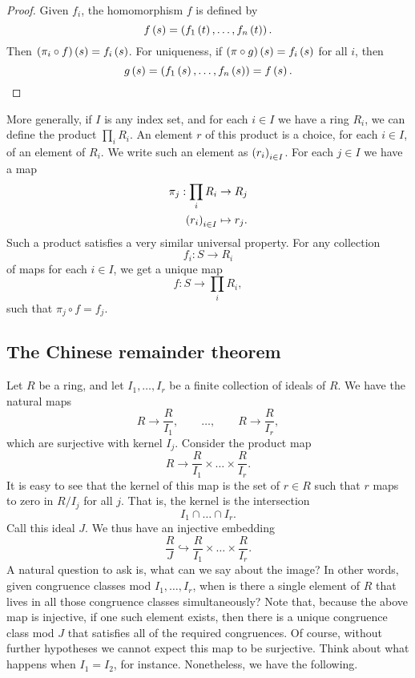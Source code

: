 \begin{proof}
Given $ f_i $, the homomorphism $ f $ is defined by
$$ f\left( s \right) = \left( f_1\left( t \right), \dots, f_n\left( t \right) \right). $$
Then $ \left( \pi_i \circ f \right)\left( s \right) = f_i\left( s \right) $. For uniqueness, if $ \left( \pi \circ g \right)\left( s \right) = f_i\left( s \right) $ for all $ i $, then
$$ g\left( s \right) = \left( f_1\left( s \right), \dots, f_n\left( s \right) \right) = f\left( s \right). $$
\end{proof}

More generally, if $ I $ is any index set, and for each $ i \in I $ we have a ring $ R_i $, we can define the product $ \prod_i R_i $. An element $ r $ of this product is a choice, for each $ i \in I $, of an element of $ R_i $. We write such an element as $ \left( r_i \right)_{i \in I} $. For each $ j \in I $ we have a map
\begin{align*}
\pi_j : \prod_i R_i & \to R_j \\
\left( r_i \right)_{i \in I} & \mapsto r_j.
\end{align*}
Such a product satisfies a very similar universal property. For any collection
$$ f_i : S \to R_i $$
of maps for each $ i \in I $, we get a unique map
$$ f : S \to \prod_i R_i, $$
such that $ \pi_j \circ f = f_j $.

\subsection{The Chinese remainder theorem}

Let $ R $ be a ring, and let $ I_1, \dots, I_r $ be a finite collection of ideals of $ R $. We have the natural maps
$$ R \to \dfrac{R}{I_1}, \qquad \dots, \qquad R \to \dfrac{R}{I_r}, $$
which are surjective with kernel $ I_j $. Consider the product map
$$ R \to \dfrac{R}{I_1} \times \dots \times \dfrac{R}{I_r}. $$
It is easy to see that the kernel of this map is the set of $ r \in R $ such that $ r $ maps to zero in $ R / I_j $ for all $ j $. That is, the kernel is the intersection
$$ I_1 \cap \dots \cap I_r. $$
Call this ideal $ J $. We thus have an injective embedding
$$ \dfrac{R}{J} \hookrightarrow \dfrac{R}{I_1} \times \dots \times \dfrac{R}{I_r}. $$
A natural question to ask is, what can we say about the image? In other words, given congruence classes mod $ I_1, \dots, I_r $, when is there a single element of $ R $ that lives in all those congruence classes simultaneously? Note that, because the above map is injective, if one such element exists, then there is a unique congruence class mod $ J $ that satisfies all of the required congruences. Of course, without further hypotheses we cannot expect this map to be surjective. Think about what happens when $ I_1 = I_2 $, for instance. Nonetheless, we have the following.

